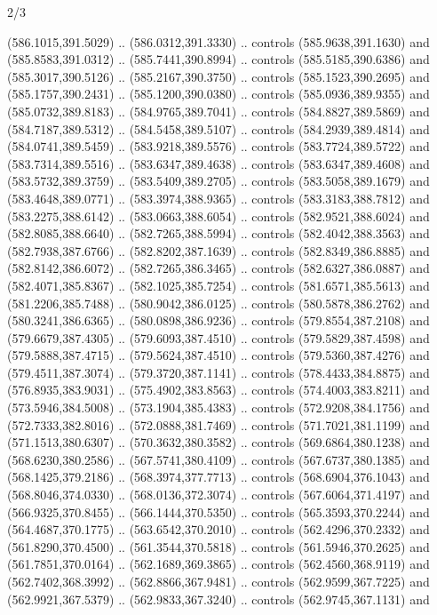 \begin{flagdescription}{2/3}
\begin{scope}[xshift=0.5\flaglength,yshift=0.5\flagwidth,scale=\flagwidth/495.65]
\begin{scope}[y=0.8pt, x=0.8pt, yscale=-1,shift={(-463.76,-309.78)}]
  (586.1015,391.5029) .. (586.0312,391.3330) .. controls (585.9638,391.1630) and
  (585.8583,391.0312) .. (585.7441,390.8994) .. controls (585.5185,390.6386) and
  (585.3017,390.5126) .. (585.2167,390.3750) .. controls (585.1523,390.2695) and
  (585.1757,390.2431) .. (585.1200,390.0380) .. controls (585.0936,389.9355) and
  (585.0732,389.8183) .. (584.9765,389.7041) .. controls (584.8827,389.5869) and
  (584.7187,389.5312) .. (584.5458,389.5107) .. controls (584.2939,389.4814) and
  (584.0741,389.5459) .. (583.9218,389.5576) .. controls (583.7724,389.5722) and
  (583.7314,389.5516) .. (583.6347,389.4638) .. controls (583.6347,389.4608) and
  (583.5732,389.3759) .. (583.5409,389.2705) .. controls (583.5058,389.1679) and
  (583.4648,389.0771) .. (583.3974,388.9365) .. controls (583.3183,388.7812) and
  (583.2275,388.6142) .. (583.0663,388.6054) .. controls (582.9521,388.6024) and
  (582.8085,388.6640) .. (582.7265,388.5994) .. controls (582.4042,388.3563) and
  (582.7938,387.6766) .. (582.8202,387.1639) .. controls (582.8349,386.8885) and
  (582.8142,386.6072) .. (582.7265,386.3465) .. controls (582.6327,386.0887) and
  (582.4071,385.8367) .. (582.1025,385.7254) .. controls (581.6571,385.5613) and
  (581.2206,385.7488) .. (580.9042,386.0125) .. controls (580.5878,386.2762) and
  (580.3241,386.6365) .. (580.0898,386.9236) .. controls (579.8554,387.2108) and
  (579.6679,387.4305) .. (579.6093,387.4510) .. controls (579.5829,387.4598) and
  (579.5888,387.4715) .. (579.5624,387.4510) .. controls (579.5360,387.4276) and
  (579.4511,387.3074) .. (579.3720,387.1141) .. controls (578.4433,384.8875) and
  (576.8935,383.9031) .. (575.4902,383.8563) .. controls (574.4003,383.8211) and
  (573.5946,384.5008) .. (573.1904,385.4383) .. controls (572.9208,384.1756) and
  (572.7333,382.8016) .. (572.0888,381.7469) .. controls (571.7021,381.1199) and
  (571.1513,380.6307) .. (570.3632,380.3582) .. controls (569.6864,380.1238) and
  (568.6230,380.2586) .. (567.5741,380.4109) .. controls (567.6737,380.1385) and
  (568.1425,379.2186) .. (568.3974,377.7713) .. controls (568.6904,376.1043) and
  (568.8046,374.0330) .. (568.0136,372.3074) .. controls (567.6064,371.4197) and
  (566.9325,370.8455) .. (566.1444,370.5350) .. controls (565.3593,370.2244) and
  (564.4687,370.1775) .. (563.6542,370.2010) .. controls (562.4296,370.2332) and
  (561.8290,370.4500) .. (561.3544,370.5818) .. controls (561.5946,370.2625) and
  (561.7851,370.0164) .. (562.1689,369.3865) .. controls (562.4560,368.9119) and
  (562.7402,368.3992) .. (562.8866,367.9481) .. controls (562.9599,367.7225) and
  (562.9921,367.5379) .. (562.9833,367.3240) .. controls (562.9745,367.1131) and

\end{scope}
\end{scope}
\end{flagdescription}
